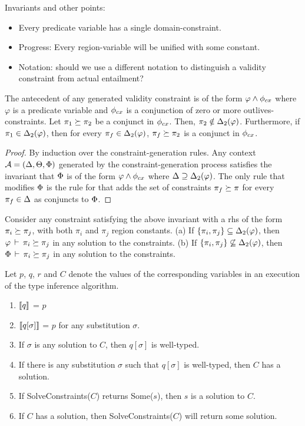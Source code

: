 Invariants and other points:
\begin{itemize}
  \item Every predicate variable has a single domain-constraint.
  \item Progress: Every region-variable will be unified with some constant.
  \item Notation: should we use a different notation to distinguish a validity constraint
    from actual entailment?
\end{itemize}

\begin{lemma}
The antecedent of any generated validity constraint is of the form
$\varphi \wedge \phi_{cx}$ where $\varphi$ is a predicate variable and
$\phi_{cx}$ is a conjunction of zero or more outlives-constraints.
Let $\pi_1 \succeq \pi_2$ be a conjunct in $\phi_{cx}$.
Then, $\pi_2 \notin {\Delta_2}(\varphi)$.
Furthermore, if $\pi_1 \in {\Delta_2}(\varphi)$, then for
every $\pi_f \in {\Delta_2}(\varphi)$, $\pi_f \succeq \pi_2$ is
a conjunct in $\phi_{cx}$.
\end{lemma}

\begin{proof}
  By induction over the constraint-generation rules.
  Any context ${\mathcal{A}} = (\Delta,\Theta,\Phi)$ generated by the constraint-generation
  process satisfies the invariant that $\Phi$ is of the form $\varphi \wedge \phi_{cx}$
  where $\Delta \supseteq {\Delta_2}(\varphi)$.
  The only rule that modifies $\Phi$ is the rule for 
  that adds the set of constraints $\pi_f \succeq \pi$ for every $\pi_f \in \Delta$
  as conjuncts to $\Phi$.
\end{proof}

\begin{lemma}
  Consider any constraint satisfying the above invariant with a rhs of the
  form $\pi_i \succeq \pi_j$, with both $\pi_i$ and $\pi_j$ region constants.
  (a) If $\{ \pi_i, \pi_j \} \subseteq {\Delta_2}(\varphi)$,
  then $\varphi\,\vdash\,\pi_i \succeq \pi_j$ in any solution to the constraints.
  (b) If $\{ \pi_i, \pi_j \} \not \subseteq {\Delta_2}(\varphi)$,
  then $\Phi\,\vdash\,\pi_i \succeq \pi_j$ in any solution to the constraints.
\end{lemma}

\begin{theorem}
Let $p$, $q$, $r$ and $C$ denote the values of the corresponding
variables in an execution of the type inference algorithm.
\begin{enumerate}
\item $\llbracket q \rrbracket$ = $p$
\item $\llbracket q[\sigma] \rrbracket$ = $p$ for any substitution $\sigma$.
\item If $\sigma$ is any solution to $C$, then $q[\sigma]$ is well-typed.
\item If there is any substitution $\sigma$ such that $q[\sigma]$ is well-typed, then
$C$ has a solution.
\item If SolveConstraints($C$) returns Some($s$), then $s$ is a solution to $C$.
\item If $C$ has a  solution, then SolveConstraints($C$) will return some solution.
\end{enumerate}
\end{theorem}
